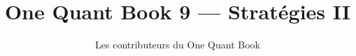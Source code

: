 \documentclass[11pt,a4paper,twoside,openany]{book}
\title{One Quant Book 9 --- Stratégies II}
\author{Les contributeurs du One Quant Book}
\date{\bookdate}
\begin{document}
\frontmatter



\tableofcontents

\mainmatter


\appendix
\part{\omsolutionspart}


\backmatter
\printindex
\end{document}
